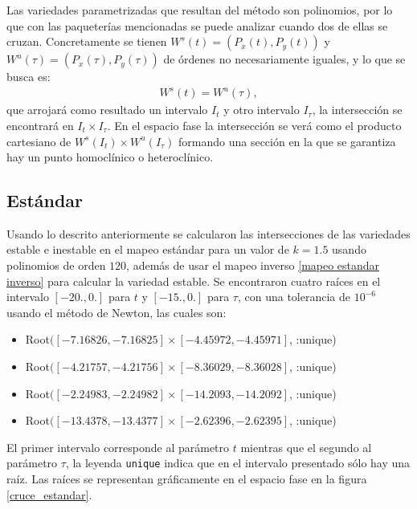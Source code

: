Las variedades parametrizadas que resultan del método son polinomios, por lo que con las paqueterías  mencionadas se puede analizar cuando dos de ellas se cruzan. Concretamente se tienen  $W^{s}(t)=(P_{x}(t),P_{y}(t))$ y $W^{u}(\tau)=(P_{x}(\tau),P_{y}(\tau))$ de órdenes no necesariamente iguales, y lo que se busca es:
\begin{eqnarray}
W^{s}(t)=W^{u}(\tau),
\end{eqnarray}
que arrojará como resultado un intervalo $I_{t}$ y otro intervalo $I_{\tau}$, la intersección se encontrará en $I_{t}\times I_{\tau}$. En el espacio fase la intersección se verá como el producto cartesiano de $W^{s}(I_{t})\times W^{u}(I_{\tau})$ formando una sección en la que se garantiza hay un punto homoclínico o heteroclínico. 


\subsection{Estándar}
Usando lo descrito anteriormente se calcularon las intersecciones de las variedades estable e inestable en el mapeo estándar para un valor de $k=1.5$ usando polinomios de orden $120$, además de usar el mapeo inverso \eqref{mapeo estandar inverso} para calcular la variedad estable. Se encontraron cuatro raíces en el intervalo $[-20.,0.]$ para $t$  y $[-15.,0.]$ para $\tau$, con una tolerancia de $10^{-6}$ usando el método de Newton, las cuales son:
\begin{itemize}
\item Root$([-7.16826, -7.16825] \times [-4.45972, -4.45971]$, :unique)
\item Root$([-4.21757, -4.21756] \times [-8.36029, -8.36028]$, :unique)
\item Root$([-2.24983, -2.24982] \times [-14.2093, -14.2092]$, :unique)
\item Root$([-13.4378, -13.4377] \times [-2.62396, -2.62395]$, :unique)
\end{itemize}
El primer intervalo corresponde al parámetro $t$ mientras que el segundo al parámetro $\tau$, la leyenda \texttt{unique} indica que en el intervalo presentado sólo hay una raíz. Las raíces se representan gráficamente en el espacio fase en la figura \ref{cruce_estandar}. 

